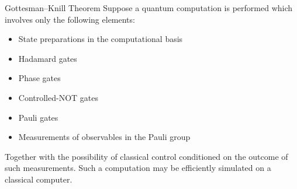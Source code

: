 \begin{frame}{Gottesman–Knill Theorem}
    Suppose a quantum computation is performed which involves only the following elements:
    \begin{itemize}
        \item
        State preparations in the computational basis
        \item
        Hadamard gates
        \item
        Phase gates
        \item
        Controlled-NOT gates
        \item
        Pauli gates
        \item
        Measurements of observables in the Pauli group
    \end{itemize}

    \vspace*{1mm}

    Together with the possibility of classical control conditioned on the outcome of such measurements.
    Such a computation may be efficiently simulated on a classical computer.
\end{frame}